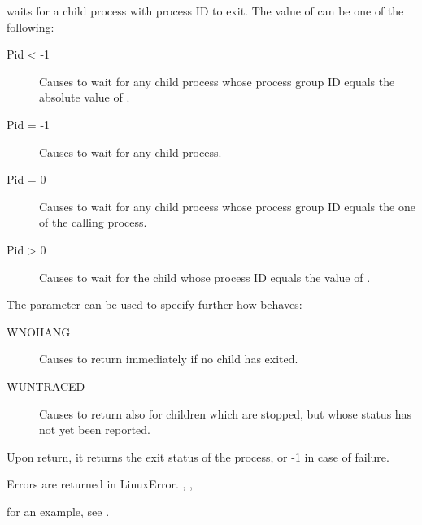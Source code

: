 

{  waits for a child process with process ID  to exit. The
value of  can be one of the following:
\begin{description}
\item[Pid < -1] Causes  to wait for  any  child  process  whose
              process group ID equals the absolute value of .

\item[Pid = -1] Causes  to wait for any child process.

\item[Pid = 0] Causes  to wait for  any  child  process  whose
              process  group  ID  equals the one of the calling
              process.

\item[Pid > 0] Causes  to wait for the child whose process  ID
equals the value of .
\end{description}
The  parameter can be used to specify further how 
behaves:
\begin{description}
\item [WNOHANG] Causes  to return immediately if no child  has
exited.
\item [WUNTRACED] Causes  to return also for children which are
stopped, but whose status has not yet been reported.
\end{description} 

Upon return, it returns the exit status of the process, or -1 in case of
failure. 
}
{Errors are returned in LinuxError.}
{, , }

for an example, see .

